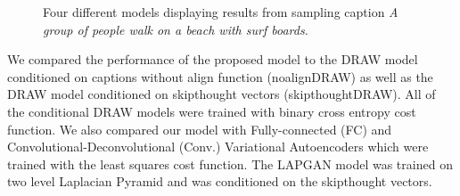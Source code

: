\documentclass{article} %
\begin{document}
\begin{figure}[!t]
\captionsetup[subfigure]{labelformat=empty}
\begin{center}
\quad
%
\quad
%
\quad
%
\quad
%
\end{center}
\caption{Four different models displaying results from sampling caption \textit{A group of people walk on a beach with surf boards.}}
\label{fig:diffmodels}
\vspace{-0.2cm}
\end{figure}

We compared the performance of the proposed model to the DRAW model conditioned on captions without align function (noalignDRAW) as well as the DRAW model conditioned on skipthought vectors (skipthoughtDRAW). All of the conditional DRAW models were trained with binary cross entropy cost function. We also compared our model with Fully-connected (FC) and Convolutional-Deconvolutional (Conv.) Variational Autoencoders which were trained with the least squares cost function. The LAPGAN model was trained on two level Laplacian Pyramid and was conditioned on the skipthought vectors. 
\end{document}
